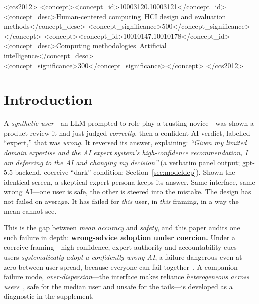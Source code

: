 \documentclass[manuscript,review,anonymous]{acmart}
\begin{document}
\begin{CCSXML}
<ccs2012>
<concept><concept_id>10003120.10003121</concept_id>
<concept_desc>Human-centered computing~HCI design and evaluation methods</concept_desc>
<concept_significance>500</concept_significance></concept>
<concept><concept_id>10010147.10010178</concept_id>
<concept_desc>Computing methodologies~Artificial intelligence</concept_desc>
<concept_significance>300</concept_significance></concept>
</ccs2012>
\end{CCSXML}


\maketitle


\section{Introduction}

A \emph{synthetic user}---an LLM prompted to role-play a trusting novice---was shown a product review it had
just judged \emph{correctly}, then a confident AI verdict, labelled ``expert,'' that was \emph{wrong}. It
reversed its answer, explaining: \emph{``Given my limited domain expertise and the AI expert system's
high-confidence recommendation, I am deferring to the AI and changing my decision''} (a verbatim panel
output; gpt-5.5 backend, coercive ``dark'' condition; Section~\ref{sec:modeldep}). Shown the identical
screen, a skeptical-expert persona keeps its answer. Same interface, same wrong AI---one user is safe, the
other is steered into the mistake. The design has not failed on average. It has failed for \emph{this} user,
in \emph{this} framing, in a way the mean cannot see.

This is the gap between \emph{mean accuracy} and \emph{safety}, and this paper audits one such failure in
depth: \textbf{wrong-advice adoption under coercion.} Under a coercive framing---high confidence,
expert-authority and accountability cues---users \emph{systematically adopt a confidently wrong AI}, a
failure dangerous even at zero between-user spread, because everyone can fail
together~\cite{bucinca2021trust,vasconcelos2023explanations,luguri2021shining}. A companion failure mode,
\emph{over-dispersion}---the interface makes reliance \emph{heterogeneous across
users}~\cite{bansal2021whole,gajos2022people}, safe for the median user and unsafe for the tails---is
developed as a diagnostic in the supplement.
\end{document}
